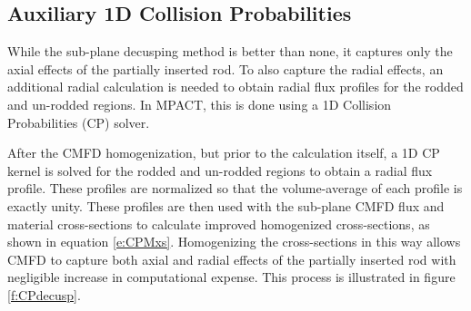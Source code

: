 %

\subsection{Auxiliary 1D Collision Probabilities}

While the sub-plane decusping method is better than none, it captures only the axial effects of the partially inserted rod.  To also capture the radial effects, an additional radial calculation is needed to obtain radial flux profiles for the rodded and un-rodded regions.  In MPACT, this is done using a 1D Collision Probabilities (CP) solver.

After the CMFD homogenization, but prior to the calculation itself, a 1D CP kernel is solved for the rodded and un-rodded regions to obtain a radial flux profile.  These profiles are normalized so that the volume-average of each profile is exactly unity.  These profiles are then used with the sub-plane CMFD flux and material cross-sections to calculate improved homogenized cross-sections, as shown in equation \ref{e:CPMxs}.  Homogenizing the cross-sections in this way allows CMFD to capture both axial and radial effects of the partially inserted rod with negligible increase in computational expense.  This process is illustrated in figure \ref{f:CPdecusp}.

